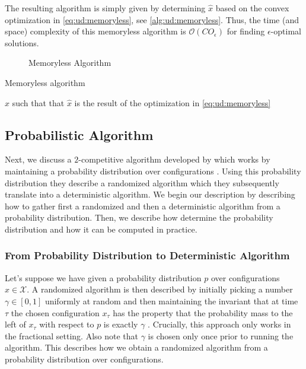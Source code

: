 The resulting algorithm is simply given by determining $\hat{x}$ based on the convex optimization in \autoref{eq:ud:memoryless}, see \autoref{alg:ud:memoryless}. Thus, the time (and space) complexity of this memoryless algorithm is $\mathcal{O}(C O_{\epsilon})$ for finding $\epsilon$-optimal solutions.

\begin{figure}

    \caption{Memoryless Algorithm}
    \label{fig:memoryless_algorithm}
\end{figure}

\begin{algorithm}
    \caption{Memoryless algorithm \cite{Bansal2015}}\label{alg:ud:memoryless}
    \Return $\hat{x}$ such that that $\hat{x}$ is the result of the optimization in \autoref{eq:ud:memoryless}\;
\end{algorithm}

\subsection{Probabilistic Algorithm}\label{section:online_algorithms:ud:probabilistic}

Next, we discuss a $2$-competitive algorithm developed by \citeauthor*{Bansal2015} which works by maintaining a probability distribution over configurations \cite{Bansal2015}. Using this probability distribution they describe a randomized algorithm which they subsequently translate into a deterministic algorithm. We begin our description by describing how to gather first a randomized and then a deterministic algorithm from a probability distribution. Then, we describe how \citeauthor*{Bansal2015} determine the probability distribution and how it can be computed in practice.

\subsubsection{From Probability Distribution to Deterministic Algorithm}

Let's suppose we have given a probability distribution $p$ over configurations $x \in \mathcal{X}$. A randomized algorithm is then described by initially picking a number $\gamma \in [0,1]$ uniformly at random and then maintaining the invariant that at time $\tau$ the chosen configuration $x_{\tau}$ has the property that the probability mass to the left of $x_{\tau}$ with respect to $p$ is exactly $\gamma$ \cite{Bansal2015}. Crucially, this approach only works in the fractional setting. Also note that $\gamma$ is chosen only once prior to running the algorithm. This describes how we obtain a randomized algorithm from a probability distribution over configurations.

